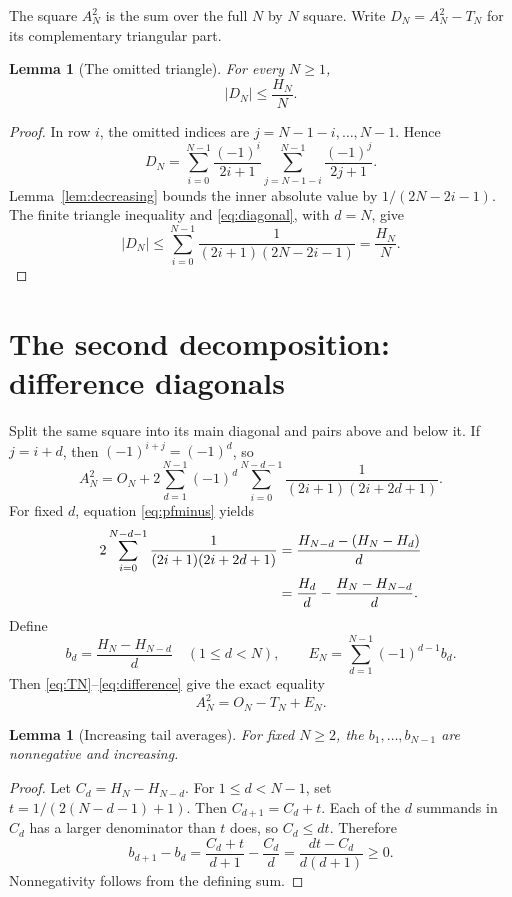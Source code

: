 \documentclass[11pt,a4paper]{article}
\newtheorem{lemma}[theorem]{Lemma}
\theoremstyle{remark}\newtheorem{remark}[theorem]{Remark}
\newcommand{\abs}[1]{\left|#1\right|}
\begin{document}
The square $A_N^2$ is the sum over the full $N$ by $N$ square.
Write $D_N=A_N^2-T_N$ for its complementary triangular part.

\begin{lemma}[The omitted triangle]\label{lem:D}
For every $N\ge1$,
\begin{equation}\label{eq:D}
 \abs{D_N}\le\frac{H_N}{N}.
\end{equation}
\end{lemma}
\begin{proof}
In row $i$, the omitted indices are $j=N-1-i,\ldots,N-1$.
Hence
\[
 D_N=\sum_{i=0}^{N-1}\frac{(-1)^i}{2i+1}
       \sum_{j=N-1-i}^{N-1}\frac{(-1)^j}{2j+1}.
\]
Lemma~\ref{lem:decreasing} bounds the inner absolute value by
$1/(2N-2i-1)$. The finite triangle inequality and
\eqref{eq:diagonal}, with $d=N$, give
\[
 \abs{D_N}\le
 \sum_{i=0}^{N-1}\frac1{(2i+1)(2N-2i-1)}=\frac{H_N}{N}.
\]
\end{proof}

\section{The second decomposition: difference diagonals}\label{sec:difference}

Split the same square into its main diagonal and pairs above and below
it. If $j=i+d$, then $(-1)^{i+j}=(-1)^d$, so
\begin{equation}\label{eq:square}
 A_N^2=O_N+
 2\sum_{d=1}^{N-1}(-1)^d
 \sum_{i=0}^{N-d-1}\frac1{(2i+1)(2i+2d+1)}.
\end{equation}
For fixed $d$, equation \eqref{eq:pfminus} yields
\begin{align}
 2\sum_{i=0}^{N-d-1}\frac1{(2i+1)(2i+2d+1)}
 &=\frac{H_{N-d}-(H_N-H_d)}d\notag\\
 &=\frac{H_d}d-\frac{H_N-H_{N-d}}d.\label{eq:difference}
\end{align}
Define
\begin{equation}\label{eq:bE}
 b_d=\frac{H_N-H_{N-d}}d\quad(1\le d<N),\qquad
 E_N=\sum_{d=1}^{N-1}(-1)^{d-1}b_d.
\end{equation}
Then \eqref{eq:TN}--\eqref{eq:difference} give the exact equality
\begin{equation}\label{eq:second}
 \boxed{A_N^2=O_N-T_N+E_N.}
\end{equation}

\begin{lemma}[Increasing tail averages]\label{lem:average}
For fixed $N\ge2$, the $b_1,\ldots,b_{N-1}$ are nonnegative and
increasing.
\end{lemma}
\begin{proof}
Let $C_d=H_N-H_{N-d}$. For $1\le d<N-1$, set
$t=1/(2(N-d-1)+1)$. Then $C_{d+1}=C_d+t$.
Each of the $d$ summands in $C_d$ has a larger denominator than
$t$ does, so $C_d\le dt$. Therefore
\[
 b_{d+1}-b_d
 =\frac{C_d+t}{d+1}-\frac{C_d}{d}
 =\frac{dt-C_d}{d(d+1)}\ge0.
\]
Nonnegativity follows from the defining sum.
\end{proof}
\end{document}
